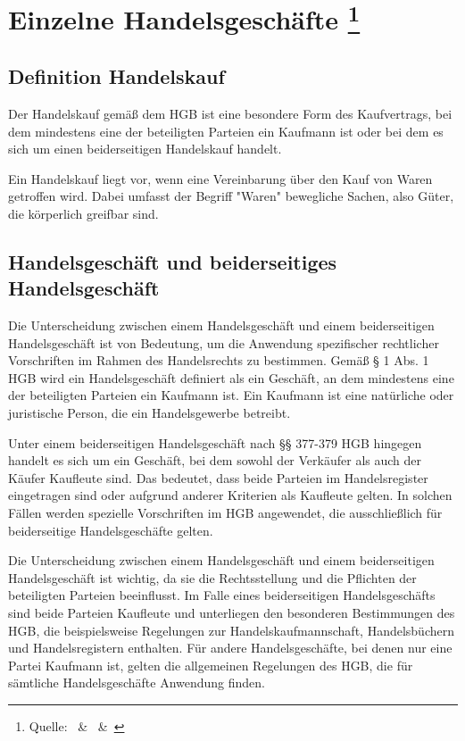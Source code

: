 
\chapter[Einzelne Handelsgeschäfte]{Einzelne Handelsgeschäfte \footnote{Quelle:~\cite{Handelsrecht} \&~\cite{Großkommentar_HGB} \&~\cite{handelskauf}}}

\section{Definition Handelskauf}
Der Handelskauf gemäß dem \ac{HGB} ist eine besondere Form des Kaufvertrags, bei dem mindestens eine der beteiligten Parteien ein Kaufmann ist oder bei dem es sich um einen beiderseitigen Handelskauf handelt.

Ein Handelskauf liegt vor, wenn eine Vereinbarung über den Kauf von Waren getroffen wird. Dabei umfasst der Begriff "Waren" bewegliche Sachen, also Güter, die körperlich greifbar sind.


\section{Handelsgeschäft und beiderseitiges Handelsgeschäft}
Die Unterscheidung zwischen einem Handelsgeschäft und einem beiderseitigen Handelsgeschäft ist von Bedeutung, um die Anwendung spezifischer rechtlicher Vorschriften im Rahmen des Handelsrechts zu bestimmen. Gemäß § 1 Abs. 1 \ac{HGB} wird ein Handelsgeschäft definiert als ein Geschäft, an dem mindestens eine der beteiligten Parteien ein Kaufmann ist. Ein Kaufmann ist eine natürliche oder juristische Person, die ein Handelsgewerbe betreibt.

Unter einem beiderseitigen Handelsgeschäft nach §§ 377-379 \ac{HGB} hingegen handelt es sich um ein Geschäft, bei dem sowohl der Verkäufer als auch der Käufer Kaufleute sind. Das bedeutet, dass beide Parteien im Handelsregister eingetragen sind oder aufgrund anderer Kriterien als Kaufleute gelten. In solchen Fällen werden spezielle Vorschriften im HGB angewendet, die ausschließlich für beiderseitige Handelsgeschäfte gelten.

Die Unterscheidung zwischen einem Handelsgeschäft und einem beiderseitigen Handelsgeschäft ist wichtig, da sie die Rechtsstellung und die Pflichten der beteiligten Parteien beeinflusst. Im Falle eines beiderseitigen Handelsgeschäfts sind beide Parteien Kaufleute und unterliegen den besonderen Bestimmungen des \ac{HGB}, die beispielsweise Regelungen zur Handelskaufmannschaft, Handelsbüchern und Handelsregistern enthalten. Für andere Handelsgeschäfte, bei denen nur eine Partei Kaufmann ist, gelten die allgemeinen Regelungen des HGB, die für sämtliche Handelsgeschäfte Anwendung finden.
